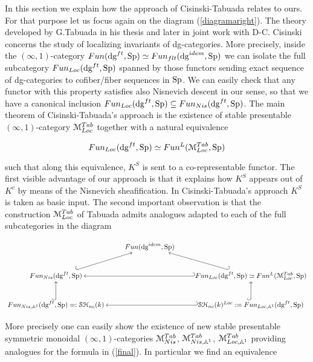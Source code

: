 \begin{refsection}
In this section we explain how the approach of Cisinski-Tabuada relates to ours. For that purpose let us focus again on the diagram  (\ref{diagramaright}). The theory developed by G.Tabuada \cite{tabuada-higherktheory} in his thesis and later in joint work with D-C. Cisinski \cite{tabuada-cisinski, MR2822869} concerns the study of localizing invariants of dg-categories. More precisely, inside the $(\infty,1)$-category $Fun(\mathrm{dg}^{ft}, \mathrm{Sp})\simeq Fun_{flt}(\mathrm{dg}^{idem}, \mathrm{Sp})$ we can isolate the full subcategory $Fun_{Loc}(\mathrm{dg}^{ft}, \mathrm{Sp})$ spanned by those functors sending exact sequence of dg-categories to cofiber/fiber sequences in $\mathrm{Sp}$. We can easily check that any functor with this property satisfies also Nisnevich descent in our sense, so that we have a canonical inclusion  $Fun_{Loc}(\mathrm{dg}^{ft}, \mathrm{Sp})\subseteq Fun_{Nis}(\mathrm{dg}^{ft}, \mathrm{Sp})$. The main theorem of Cisinski-Tabuada's approach is the existence of stable presentable $(\infty,1)$-category $\mathcal{M}^{Tab}_{Loc}$ together with a natural equivalence 

\begin{equation}
\label{final}
Fun_{Loc}(\mathrm{dg}^{ft}, \mathrm{Sp})\simeq Fun^L(\mathcal{M}^{Tab}_{Loc},\mathrm{Sp})
\end{equation}

\noindent such that along this equivalence, $K^S$ is sent to a co-representable functor. The first visible advantage of our approach is that it explains how $K^S$ appears out of $K^c$ by means of the Nisnevich sheafification. In Cisinski-Tabuada's approach $K^S$ is taken as basic input. The second important observation is that the construction  $\mathcal{M}^{Tab}_{Loc}$ of Tabuada admits analogues adapted to each of  the full subcategories in the diagram


\begin{equation}
\xymatrix{
&Fun(\dg^{idem}, \Sp)&\\
 Fun_{Nis}(\dg^{ft}, \Sp)\ar@{^{(}->}[ur]&&\ar@{_{(}->}[ll] \ar@{_{(}->}[ul]Fun_{Loc}(\dg^{ft}, \Sp)\simeq Fun^{L}(\M^{Tab}_{Loc}, \Sp)\\
 Fun_{Nis, \mathbb{A}^1}(\dg^{ft}, \Sp)=: \stnck\ar@{^{(}->}[u]&&\ar@{_{(}->}[ll]\ar@{^{(}->}[u]\stnck^{Loc}:=Fun_{Loc, \mathbb{A}^1}(\dg^{ft}, \Sp)
}
\end{equation}

More precisely  one can easily show the existence of new stable presentable symmetric monoidal  $(\infty,1)$-categories $\mathcal{M}^{Tab}_{Nis}$, $\mathcal{M}^{Tab}_{Nis, \mathbb{A}^1}$, $\mathcal{M}^{Tab}_{Loc, \mathbb{A}^1}$ providing analogues for the formula in (\ref{final}). In particular we find an equivalence


\end{refsection}
